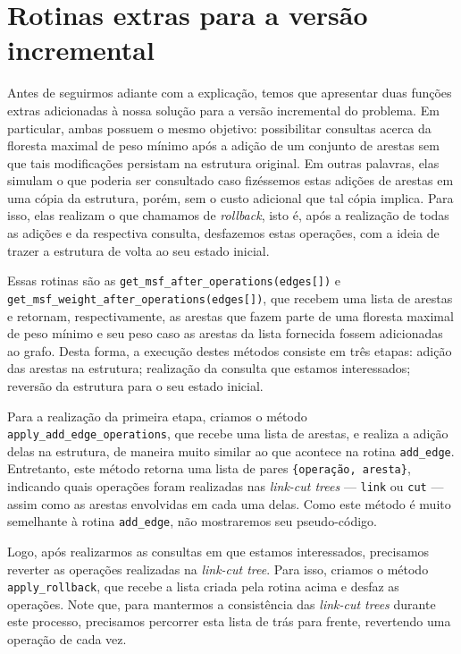 \section{Rotinas extras para a versão incremental}
\label{sec:rmsf-extras}

Antes de seguirmos adiante com a explicação, temos que apresentar duas funções extras adicionadas à nossa solução para a versão incremental do problema. Em particular, ambas possuem o mesmo objetivo: possibilitar consultas acerca da floresta maximal de peso mínimo após a adição de um conjunto de arestas sem que tais modificações persistam na estrutura original. Em outras palavras, elas simulam o que poderia ser consultado caso fizéssemos estas adições de arestas em uma cópia da estrutura, porém, sem o custo adicional que tal cópia implica. Para isso, elas realizam o que chamamos de \emph{rollback}, isto é, após a realização de todas as adições e da respectiva consulta, desfazemos estas operações, com a ideia de trazer a estrutura de volta ao seu estado inicial.

Essas rotinas são as \texttt{get\_msf\_after\_operations(edges[])} e \texttt{get\_msf\_weight\_after\_operations(edges[])}, que recebem uma lista de arestas e retornam, respectivamente, as arestas que fazem parte de uma floresta maximal de peso mínimo e seu peso caso as arestas da lista fornecida fossem adicionadas ao grafo. Desta forma, a execução destes métodos consiste em três etapas: adição das arestas na estrutura; realização da consulta que estamos interessados; reversão da estrutura para o seu estado inicial.

Para a realização da primeira etapa, criamos o método \texttt{apply\_add\_edge\_operations}, que recebe uma lista de arestas, e realiza a adição delas na estrutura, de maneira muito similar ao que acontece na rotina \texttt{add\_edge}. Entretanto, este método retorna uma lista de pares \texttt{\{operação, aresta\}}, indicando quais operações foram realizadas nas \emph{link-cut trees} --- \texttt{link} ou \texttt{cut} --- assim como as arestas envolvidas em cada uma delas. Como este método é muito semelhante à rotina \texttt{add\_edge}, não mostraremos seu pseudo-código.

Logo, após realizarmos as consultas em que estamos interessados, precisamos reverter as operações realizadas na \emph{link-cut tree}. Para isso, criamos o método \texttt{apply\_rollback}, que recebe a lista criada pela rotina acima e desfaz as operações. Note que, para mantermos a consistência das \emph{link-cut trees} durante este processo, precisamos percorrer esta lista de trás para frente, revertendo uma operação de cada vez.

